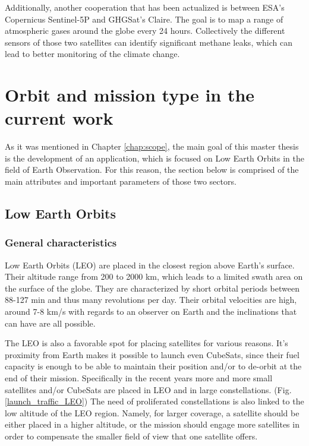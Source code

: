 Additionally, another cooperation that has been actualized is between ESA's Copernicus Sentinel-5P and GHGSat’s Claire. The goal is to map a range of atmospheric gases around the globe every 24 hours. Collectively the different sensors of those two satellites can identify significant methane leaks, which can lead to better monitoring of the climate change. \cite{cooperation} %


\bigskip
\section{Orbit and mission type in the current work}
\bigskip

As it was mentioned in Chapter \ref{chap:scope}, the main goal of this master thesis is the development of an application, which is focused on Low Earth Orbits in the field of Earth Observation. For this reason, the section below is comprised of the main attributes and important parameters of those two sectors.

\bigskip
\subsection{Low Earth Orbits}
\bigskip

\subsubsection{General characteristics}
\bigskip
Low Earth Orbits (LEO) are placed in the closest region above Earth's surface. Their altitude range from 200 to 2000 km, which leads to a limited swath area on the surface of the globe. They are characterized by short orbital periods between 88-127 min and thus many revolutions per day. Their orbital velocities are high, around 7-8 km/s with regards to an observer on Earth and the inclinations that can have are all possible. \cite{Campbell}

The LEO is also a favorable spot for placing satellites for various reasons. It's proximity from Earth makes it possible to launch even CubeSats, since their fuel capacity is enough to be able to maintain their position and/or to de-orbit at the end of their mission. Specifically in the recent years more and more small satellites and/or CubeSats are placed in LEO and in large constellations. (Fig. \ref{launch_traffic_LEO}) The need of proliferated constellations is also linked to the low altitude of the LEO region. Namely, for larger coverage, a satellite should be either placed in a higher altitude, or the mission should engage more satellites in order to compensate the smaller field of view that one satellite offers.

